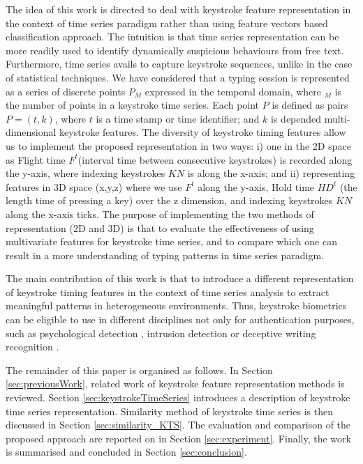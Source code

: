 \documentclass[runningheads,a4paper]{llncs}
\begin{document}
The idea of this work is directed to deal with keystroke feature representation in the context of time series paradigm rather than using feature vectors based classification approach. The intuition is that time series representation can be more readily used to identify dynamically suspicious behaviours from free text. Furthermore, time series avails to capture keystroke sequences, unlike in the case of statistical techniques. We have considered that a typing session is represented as a series of discrete points $P_M$ expressed in the temporal domain, where $_M$ is the number of points in a keystroke time series. Each point $P$ is defined as pairs $P = (t,k)$, where $t$ is a time stamp or time identifier; and $k$ is depended multi-dimensional keystroke features. The diversity of keystroke timing features allow us to implement the proposed representation in two ways: i) one in the 2D space as Flight time $F^t$(interval time between consecutive keystrokes) is recorded along the y-axis, where indexing keystrokes $KN$ is along the x-axis; and ii) representing features in 3D space (x,y,z) where we use $F^t$ along the y-axis, Hold time $HD^t$ (the length time of pressing a key) over the z dimension, and indexing keystrokes $KN$ along the x-axis ticks. The purpose of implementing the two methods of representation (2D and 3D) is that to evaluate the effectiveness of using multivariate features for keystroke time series, and to compare which one can result in a more understanding of typing patterns in time series paradigm.   

The main contribution of this work is that to introduce a different representation of keystroke timing features in the context of time series analysis to extract meaningful patterns in heterogeneous environments. Thus, keystroke biometrics can be eligible to use in different disciplines not only for authentication purposes, such as psychological detection \cite{bixler2013detecting}, intrusion detection \cite{sridhar2013intrusion} or deceptive writing recognition \cite{choikeystroke}. 

The remainder of this paper is organised as follows. In Section \ref{sec:previousWork}, related work of keystroke feature representation methods is reviewed. Section \ref{sec:keystrokeTimeSeries} introduces a description of keystroke time series representation. Similarity method of keystroke time series is then discussed in Section \ref{sec:similarity_KTS}. The evaluation and comparison of the proposed approach are reported on in Section \ref{sec:experiment}. Finally, the work is summarised and concluded in Section \ref{sec:conclusion}. 
\end{document}

